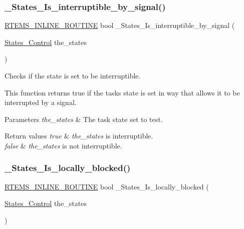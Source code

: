 \subsubsection{\texorpdfstring{\_States\_Is\_interruptible\_by\_signal()}{\_States\_Is\_interruptible\_by\_signal()}}
{\footnotesize\ttfamily \mbox{\hyperlink{group__RTEMSScoreBaseDefs_gac216239df231d5dbd15e3520b0b9313f}{R\+T\+E\+M\+S\+\_\+\+I\+N\+L\+I\+N\+E\+\_\+\+R\+O\+U\+T\+I\+NE}} bool \+\_\+\+States\+\_\+\+Is\+\_\+interruptible\+\_\+by\+\_\+signal (\begin{DoxyParamCaption}\item[{\mbox{\hyperlink{group__RTEMSScoreStates_gaeebbea0bfca162709b124fd519cf99d3}{States\+\_\+\+Control}}}]{the\+\_\+states }\end{DoxyParamCaption})}



Checks if the state is set to be interruptible. 

This function returns true if the task\textquotesingle{}s state is set in way that allows it to be interrupted by a signal.


\begin{DoxyParams}{Parameters}
{\em the\+\_\+states} & The task state set to test.\\
\hline
\end{DoxyParams}

\begin{DoxyRetVals}{Return values}
{\em true} & {\itshape the\+\_\+states} is interruptible. \\
\hline
{\em false} & {\itshape the\+\_\+states} is not interruptible. \\
\hline
\end{DoxyRetVals}
\mbox{\label{group__RTEMSScoreStates_ga7e400c2fe473664f779821942c007f54}} 
\subsubsection{\texorpdfstring{\_States\_Is\_locally\_blocked()}{\_States\_Is\_locally\_blocked()}}
{\footnotesize\ttfamily \mbox{\hyperlink{group__RTEMSScoreBaseDefs_gac216239df231d5dbd15e3520b0b9313f}{R\+T\+E\+M\+S\+\_\+\+I\+N\+L\+I\+N\+E\+\_\+\+R\+O\+U\+T\+I\+NE}} bool \+\_\+\+States\+\_\+\+Is\+\_\+locally\+\_\+blocked (\begin{DoxyParamCaption}\item[{\mbox{\hyperlink{group__RTEMSScoreStates_gaeebbea0bfca162709b124fd519cf99d3}{States\+\_\+\+Control}}}]{the\+\_\+states }\end{DoxyParamCaption})}



